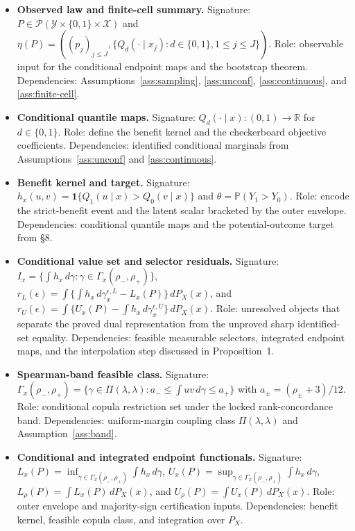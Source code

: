 \documentclass[11pt]{article}
\renewcommand{\Pr}{\mathbb{P}}
\newcommand{\one}{\mathbf{1}}
\theoremstyle{definition}
\theoremstyle{plain}
\theoremstyle{remark}
\begin{document}
\begin{itemize}[leftmargin=*]
\item \textbf{Observed law and finite-cell summary.} Signature: \(P\in\mathcal P(\mathcal Y\times\{0,1\}\times\mathcal X)\) and \(\eta(P)=((p_j)_{j\le J},\{Q_d(\cdot\mid x_j):d\in\{0,1\},1\le j\le J\})\).  Role: observable input for the conditional endpoint maps and the bootstrap theorem.  Dependencies: Assumptions~\ref{ass:sampling}, \ref{ass:unconf}, \ref{ass:continuous}, and \ref{ass:finite-cell}.
\item \textbf{Conditional quantile maps.} Signature: \(Q_d(\cdot\mid x)\colon(0,1)\to\mathbb R\) for \(d\in\{0,1\}\).  Role: define the benefit kernel and the checkerboard objective coefficients.  Dependencies: identified conditional marginals from Assumptions~\ref{ass:unconf} and \ref{ass:continuous}.
\item \textbf{Benefit kernel and target.} Signature: \(h_x(u,v)=\one\{Q_1(u\mid x)>Q_0(v\mid x)\}\) and \(\theta=\Pr(Y_1>Y_0)\).  Role: encode the strict-benefit event and the latent scalar bracketed by the outer envelope.  Dependencies: conditional quantile maps and the potential-outcome target from \S8.
\item \textbf{Conditional value set and selector residuals.} Signature: \(I_x=\{\int h_x\,d\gamma:\gamma\in\Gamma_x(\rho_-,\rho_+)\}\), \(r_L(\epsilon)=\int\{\int h_x\,d\gamma_x^{\epsilon,L}-L_x(P)\}\,dP_X(x)\), and \(r_U(\epsilon)=\int\{U_x(P)-\int h_x\,d\gamma_x^{\epsilon,U}\}\,dP_X(x)\).  Role: unresolved objects that separate the proved dual representation from the unproved sharp identified-set equality.  Dependencies: feasible measurable selectors, integrated endpoint maps, and the interpolation step discussed in Proposition~1.
\item \textbf{Spearman-band feasible class.} Signature: \(\Gamma_x(\rho_-,\rho_+)=\{\gamma\in\Pi(\lambda,\lambda):a_-\le\int uv\,d\gamma\le a_+\}\) with \(a_\pm=(\rho_\pm+3)/12\).  Role: conditional copula restriction set under the locked rank-concordance band.  Dependencies: uniform-margin coupling class \(\Pi(\lambda,\lambda)\) and Assumption~\ref{ass:band}.
\item \textbf{Conditional and integrated endpoint functionals.} Signature: \(L_x(P)=\inf_{\gamma\in\Gamma_x(\rho_-,\rho_+)}\int h_x\,d\gamma\), \(U_x(P)=\sup_{\gamma\in\Gamma_x(\rho_-,\rho_+)}\int h_x\,d\gamma\), \(L_\rho(P)=\int L_x(P)\,dP_X(x)\), and \(U_\rho(P)=\int U_x(P)\,dP_X(x)\).  Role: outer envelope and majority-sign certification inputs.  Dependencies: benefit kernel, feasible copula class, and integration over \(P_X\).

\end{itemize}
\end{document}
